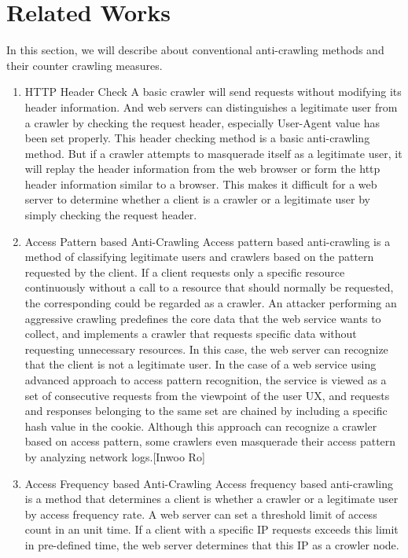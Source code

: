 \documentclass[sigconf,anonymous=true]{acmart}
\begin{document}
\section{Related Works}
In this section, we will describe about conventional anti-crawling methods and their counter crawling measures.
\begin{enumerate}
\item HTTP Header Check
\newline A basic crawler will send requests without modifying its header information. And web servers can distinguishes a legitimate user from a crawler by checking the request header, especially User-Agent value has been set properly. This header checking method is a basic anti-crawling method.
But if a crawler attempts to masquerade itself as a legitimate user, it will replay the header information from the web browser or form the http header information similar to a browser. This makes it difficult for a web server to determine whether a client is a crawler or a legitimate user by simply checking the request header.
\newline

\item Access Pattern based Anti-Crawling
\newline
Access pattern based anti-crawling is a method of classifying legitimate users and crawlers based on the pattern requested by the client. If a client requests only a specific resource continuously without a call to a resource that should normally be requested, the corresponding could be regarded as a crawler. 
An attacker performing an aggressive crawling predefines the core data that the web service wants to collect, and implements a crawler that requests specific data without requesting unnecessary resources. In this case, the web server can recognize that the client is not a legitimate user.
In the case of a web service using advanced approach to access pattern recognition, the service is viewed as a set of consecutive requests from the viewpoint of the user UX, and requests and responses belonging to the same set are chained by including a specific hash value in the cookie.
Although this approach can recognize a crawler based on access pattern, some crawlers even masquerade their access pattern by analyzing network logs.[Inwoo Ro] 
\newline 
\item Access Frequency based Anti-Crawling
\newline 
Access frequency based anti-crawling is a method that determines a client is whether a crawler or a legitimate user by access frequency rate. A web server can set a threshold limit of access count in an unit time. If a client with a specific IP requests exceeds this limit in pre-defined time, the web server determines that this IP as a crowler node.


\end{enumerate}
\end{document}
